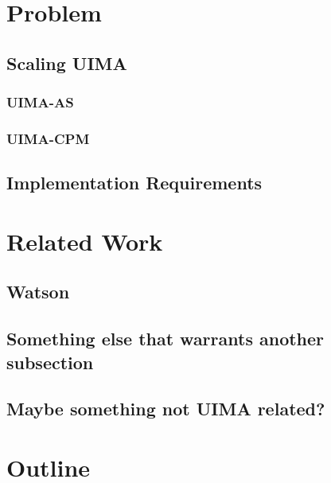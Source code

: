 \section{Problem}
\subsection{Scaling UIMA}
\subsubsection{UIMA-AS}
\subsubsection{UIMA-CPM}
\subsection{Implementation Requirements}


\section{Related Work}

\subsection{Watson}

\subsection{Something else that warrants another subsection}

\subsection{Maybe something not UIMA related?}


\section{Outline}